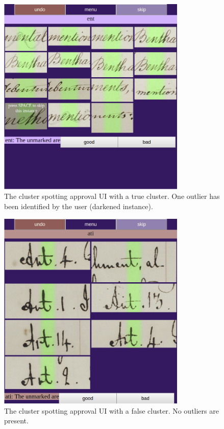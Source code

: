 \documentclass[ms,electronic,twosidetoc,letterpaper,chaptercenter,parttop,lof,lot]{byumsphd}
\begin{document}
\begin{figure}
    \centering
    \includegraphics[width=0.8\textwidth]{clustergood2}
    \caption{The cluster spotting approval UI with a true cluster. One outlier has been identified by the user (darkened instance).}
    \label{fig:clustergood}
\end{figure}
\begin{figure}
    \centering
    \includegraphics[width=0.8\textwidth]{clusterbad}
    \caption{The cluster spotting approval UI with a false cluster. No outliers are present.}
    \label{fig:clusterbad}
\end{figure}
\end{document}
